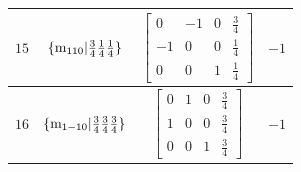 \documentclass[fleqn,8pt]{jsarticle}
\begin{document}
\begin{longtable}{cccc}
$ 15 $ & $ \{{\rm m}_{110}|\frac{3}{4} \frac{1}{4} \frac{1}{4}\} $ & $ \begin{bmatrix} 0 & -1 & 0 & \frac{3}{4} \\ -1 & 0 & 0 & \frac{1}{4} \\ 0 & 0 & 1 & \frac{1}{4} \end{bmatrix} $ & $ -1 $ \\ \hline
$ 16 $ & $ \{{\rm m}_{1-10}|\frac{3}{4} \frac{3}{4} \frac{3}{4}\} $ & $ \begin{bmatrix} 0 & 1 & 0 & \frac{3}{4} \\ 1 & 0 & 0 & \frac{3}{4} \\ 0 & 0 & 1 & \frac{3}{4} \end{bmatrix} $ & $ -1 $ \\
\end{longtable}
\end{document}
